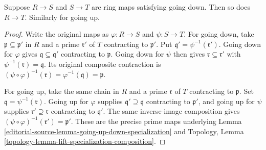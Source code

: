 \begin{lemma}
\label{editorial-source-lemma-going-up-down-composition}
Suppose $R \to S$ and $S \to T$ are ring maps satisfying
going down. Then so does $R \to T$. Similarly for going up.
\end{lemma}

\begin{proof}
Write the original maps as $\varphi:R\to S$ and
$\psi:S\to T$. For going down, take
$\mathfrak p\subseteq\mathfrak p'$ in $R$ and a prime
$\mathfrak r'$ of $T$ contracting to $\mathfrak p'$.
Put $\mathfrak q'=\psi^{-1}(\mathfrak r')$.
Going down for $\varphi$ gives
$\mathfrak q\subseteq\mathfrak q'$ contracting to
$\mathfrak p$. Going down for $\psi$ then gives
$\mathfrak r\subseteq\mathfrak r'$ with
$\psi^{-1}(\mathfrak r)=\mathfrak q$. Its original
composite contraction is
$(\psi\circ\varphi)^{-1}(\mathfrak r)
=\varphi^{-1}(\mathfrak q)=\mathfrak p$.

For going up, take the same chain in $R$ and a prime
$\mathfrak r$ of $T$ contracting to $\mathfrak p$.
Set $\mathfrak q=\psi^{-1}(\mathfrak r)$.
Going up for $\varphi$ supplies
$\mathfrak q'\supseteq\mathfrak q$ contracting to
$\mathfrak p'$, and going up for $\psi$ supplies
$\mathfrak r'\supseteq\mathfrak r$ contracting to
$\mathfrak q'$. The same inverse-image composition gives
$(\psi\circ\varphi)^{-1}(\mathfrak r')=\mathfrak p'$.
These are the precise prime maps underlying
Lemma \ref{editorial-source-lemma-going-up-down-specialization} and
Topology, Lemma \ref{topology-lemma-lift-specialization-composition}.
\end{proof}